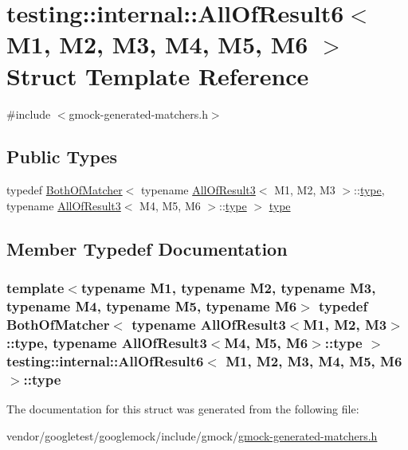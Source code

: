 \hypertarget{structtesting_1_1internal_1_1AllOfResult6}{}\section{testing\+:\+:internal\+:\+:All\+Of\+Result6$<$ M1, M2, M3, M4, M5, M6 $>$ Struct Template Reference}
\label{structtesting_1_1internal_1_1AllOfResult6}


{\ttfamily \#include $<$gmock-\/generated-\/matchers.\+h$>$}

\subsection*{Public Types}
\begin{DoxyCompactItemize}
\item 
typedef \hyperlink{classtesting_1_1internal_1_1BothOfMatcher}{Both\+Of\+Matcher}$<$ typename \hyperlink{structtesting_1_1internal_1_1AllOfResult3}{All\+Of\+Result3}$<$ M1, M2, M3 $>$\+::\hyperlink{structtesting_1_1internal_1_1AllOfResult6_a5385655911ce2c1d3fccd802c1754139}{type}, typename \hyperlink{structtesting_1_1internal_1_1AllOfResult3}{All\+Of\+Result3}$<$ M4, M5, M6 $>$\+::\hyperlink{structtesting_1_1internal_1_1AllOfResult6_a5385655911ce2c1d3fccd802c1754139}{type} $>$ \hyperlink{structtesting_1_1internal_1_1AllOfResult6_a5385655911ce2c1d3fccd802c1754139}{type}
\end{DoxyCompactItemize}


\subsection{Member Typedef Documentation}
\subsubsection[{\texorpdfstring{type}{type}}]{\setlength{\rightskip}{0pt plus 5cm}template$<$typename M1, typename M2, typename M3, typename M4, typename M5, typename M6$>$ typedef {\bf Both\+Of\+Matcher}$<$ typename {\bf All\+Of\+Result3}$<$M1, M2, M3$>$\+::{\bf type}, typename {\bf All\+Of\+Result3}$<$M4, M5, M6$>$\+::{\bf type} $>$ {\bf testing\+::internal\+::\+All\+Of\+Result6}$<$ M1, M2, M3, M4, M5, M6 $>$\+::{\bf type}}\hypertarget{structtesting_1_1internal_1_1AllOfResult6_a5385655911ce2c1d3fccd802c1754139}{}\label{structtesting_1_1internal_1_1AllOfResult6_a5385655911ce2c1d3fccd802c1754139}


The documentation for this struct was generated from the following file\+:\begin{DoxyCompactItemize}
\item 
vendor/googletest/googlemock/include/gmock/\hyperlink{gmock-generated-matchers_8h}{gmock-\/generated-\/matchers.\+h}\end{DoxyCompactItemize}
